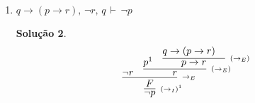 \documentclass[11pt,a4paper]{report}
\newtheorem*{Solucao}{Solu\c{c}\~ao}
\begin{document}
\begin{enumerate}
\begin{enumerate}
                 \begin{Solucao}
                   \[
                   \infer[\scriptstyle{(\lor_{IE})}]
                           {(p \land r) \lor z}
                           {
                             \infer[\scriptstyle{(\land_{I})}]
                                      {p \land r}
                                      {
                                        \infer[\scriptstyle{(\land_{EE})}]
                                                 {p}
                                                 {
                                                   \infer[\scriptstyle{(\land_{EE})}]
                                                            {p \land q}
                                                            {(p \land
                                                              q) \land
                                                            r}
                                                 }
                                                 &
                                         \infer[\scriptstyle{(\land_{ED})}]
                                                  {r}
                                                  {(p\land q) \land r}
                                      }
                           }
                   \]
                 \end{Solucao}
		\item $q\rightarrow (p\rightarrow r),\, \neg r,\, q\,
                  \vdash\,\neg p$
                \begin{Solucao}
                  \[
                  \infer[\scriptstyle{(\to_I)^1}]
                          {\neg p}
                          {
                            \infer[\scriptstyle{\to_E}]
                                     {F}
                                     {
                                       \neg r
                                       &
                                       \infer[\scriptstyle{(\to_E)}]
                                               {r}
                                               {
                                                 p^1
                                                 &
                                                 \infer[\scriptstyle{(\to_E)}]
                                                          {p \to r}
                                                          {
                                                            q \to (p
                                                            \to r)  
                                                            & 
}}}}\]
\end{Solucao}
\end{enumerate}
\end{enumerate}
\end{document}
